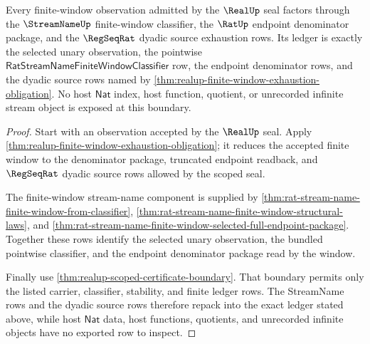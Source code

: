 \begin{theorem}
\label{thm:realup-streamname-finite-window-ledger-boundary}
Every finite-window observation admitted by the $\RealUp$ seal factors through
the $\StreamNameUp$ finite-window classifier, the $\RatUp$ endpoint denominator
package, and the $\RegSeqRat$ dyadic source exhaustion rows. Its ledger is
exactly the selected unary observation, the pointwise
$\mathsf{RatStreamNameFiniteWindowClassifier}$ row, the endpoint denominator
rows, and the dyadic source rows named by
\autoref{thm:realup-finite-window-exhaustion-obligation}. No host
$\mathsf{Nat}$ index, host function, quotient, or unrecorded infinite stream
object is exposed at this boundary.
\end{theorem}
\begin{proof}
Start with an observation accepted by the $\RealUp$ seal. Apply
\autoref{thm:realup-finite-window-exhaustion-obligation}; it reduces the
accepted finite window to the denominator package, truncated endpoint
readback, and $\RegSeqRat$ dyadic source rows allowed by the scoped seal.

The finite-window stream-name component is supplied by
\autoref{thm:rat-stream-name-finite-window-from-classifier},
\autoref{thm:rat-stream-name-finite-window-structural-laws}, and
\autoref{thm:rat-stream-name-finite-window-selected-full-endpoint-package}.
Together these rows identify the selected unary observation, the bundled
pointwise classifier, and the endpoint denominator package read by the window.

Finally use \autoref{thm:realup-scoped-certificate-boundary}. That boundary
permits only the listed carrier, classifier, stability, and finite ledger rows.
The StreamName rows and the dyadic source rows therefore repack into the exact
ledger stated above, while host $\mathsf{Nat}$ data, host functions, quotients,
and unrecorded infinite objects have no exported row to inspect.
\end{proof}

